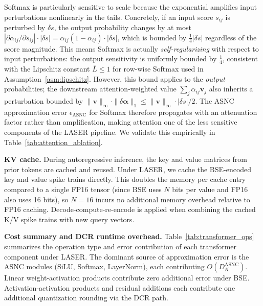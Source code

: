 \documentclass{article}
\theoremstyle{plain}
\theoremstyle{definition}
\theoremstyle{remark}
\begin{document}
Softmax is particularly sensitive to scale because the exponential amplifies input
perturbations nonlinearly in the tails. Concretely, if an input score $s_{ij}$ is
perturbed by $\delta s$, the output probability changes by at most
$|\partial \alpha_{ij}/\partial s_{ij}| \cdot |\delta s| = \alpha_{ij}(1-\alpha_{ij})
\cdot |\delta s|$, which is bounded by $\tfrac{1}{4}|\delta s|$ regardless of the
score magnitude. This means Softmax is actually \emph{self-regularizing} with respect
to input perturbations: the output sensitivity is uniformly bounded by $\tfrac{1}{4}$,
consistent with the Lipschitz constant $\bar{L} \le 1$ for row-wise Softmax used in
Assumption~\ref{asm:lipschitz}. However, this bound applies to the \emph{output}
probabilities; the downstream attention-weighted value $\sum_j \alpha_{ij} \mathbf{v}_j$
also inherits a perturbation bounded by $\|\mathbf{v}\|_\infty \cdot \|\delta\boldsymbol{\alpha}\|_1
\le \|\mathbf{v}\|_\infty \cdot |\delta s| / 2$. The ASNC approximation error
$\epsilon_\mathrm{ASNC}$ for Softmax therefore propagates with an attenuation factor
rather than amplification, making attention one of the less sensitive components of
the LASER pipeline. We validate this empirically in Table~\ref{tab:attention_ablation}.

\noindent\textbf{KV cache.}
During autoregressive inference, the key and value matrices from prior tokens are
cached and reused. Under LASER, we cache the BSE-encoded key and value spike trains
directly. This doubles the memory per cache entry compared to a single FP16 tensor
(since BSE uses $N$ bits per value and FP16 also uses 16 bits), so $N = 16$ incurs
no additional memory overhead relative to FP16 caching. Decode-compute-re-encode is
applied when combining the cached K/V spike trains with new query vectors.

\noindent\textbf{Cost summary and DCR runtime overhead.}
Table~\ref{tab:transformer_ops} summarizes the operation type and error contribution
of each transformer component under LASER. The dominant source of approximation error
is the ASNC modules (SiLU, Softmax, LayerNorm), each contributing $O(D_K^{\mathrm{ASNC}})$.
Linear weight-activation products contribute zero additional error under BSE.
Activation-activation products and residual additions each contribute one additional
quantization rounding via the DCR path.
\end{document}
